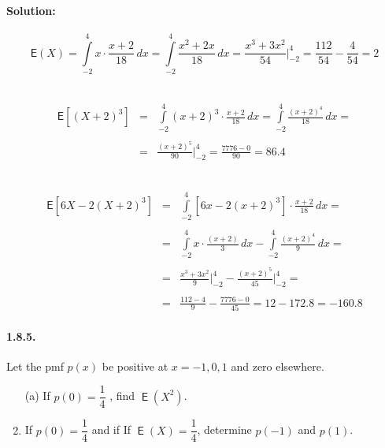 \documentclass[12pt,a4paper]{article}
\DeclareMathOperator{\E}{\mathsf{E}}
\begin{document}
\paragraph{Solution:} 

\[
	\mathsf{E}(X) = \int\limits_{-2}^{4} x\cdot\frac{x+2}{18}\, dx = \int\limits_{-2}^{4} \frac{x^{2} +2x}{18}\, dx = \frac{x^{3} + 3x^{2}}{54}\Big|_{-2}^{4} = \frac{112}{54} - \frac{4}{54} = 2
\]

\quad\\

\[
\begin{array}{lcl}
	\mathsf{E}[(X+2)^3] & = & \displaystyle \int\limits_{-2}^{4}(x + 2)^{3}\cdot\frac{x+2}{18}\, dx = \int\limits_{-2}^{4}\frac{(x+2)^{4}}{18}\, dx =\\
	\quad\\
	& = & \displaystyle \frac{(x+2)^5}{90}\Big|_{-2}^{4} = \frac{7776 - 0}{90} = 86.4
\end{array}
\]

\quad\\

\[
\begin{array}{lcl}
	\mathsf{E}[6X -2(X+2)^3] & = & \displaystyle \int\limits_{-2}^{4}[6x - 2(x + 2)^{3}]\cdot\frac{x+2}{18}\, dx = \\
	\quad\\
	& = & \displaystyle \int\limits_{-2}^{4}x\cdot\frac{(x+2)}{3}\, dx - \int\limits_{-2}^{4}\frac{(x+2)^{4}}{9}\, dx = \\
	\quad\\
	& = & \displaystyle \frac{x^{3} + 3x^{2}}{9}\Big|_{-2}^{4} - \frac{(x+2)^5}{45}\Big|_{-2}^{4} = \\
	\quad\\
	& = & \displaystyle \frac{112-4}{9} - \frac{7776-0}{45} = 12 - 172.8 =  -160.8
\end{array}
\] 

\paragraph{1.8.5.} Let the pmf $ p(x) $ be positive at $x = -1, 0, 1$ and zero elsewhere.
\begin{enumerate}
	\item[(a)] If $ p(0) = \dfrac{1}{4}$ , find $ \E(X^{2}) $.
	
	\item If $ p(0) = \dfrac{1}{4}$ and if If $ \E(X) = \dfrac{1}{4}$, determine $ p(-1)$ and $ p(1) $.
\end{enumerate}
\end{document}

